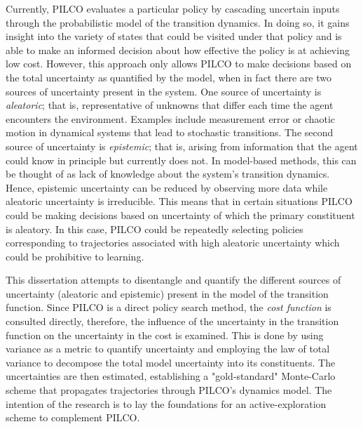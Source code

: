 Currently, PILCO evaluates a particular policy by cascading uncertain inputs through the probabilistic model of the transition dynamics. In doing so, it gains insight into the variety of states that could be visited under that policy and is able to make an informed decision about how effective the policy is at achieving low cost. However, this approach only allows PILCO to make decisions based on the total uncertainty as quantified by the model, when in fact there are two sources of uncertainty present in the system. One source of uncertainty is \textit{aleatoric}; that is, representative of unknowns that differ each time the agent encounters the environment. Examples include measurement error or chaotic motion in dynamical systems that lead to stochastic transitions. The second source of uncertainty is \textit{epistemic}; that is, arising from information that the agent could know in principle but currently does not. In model-based methods, this can be thought of as lack of knowledge about the system's transition dynamics. Hence, epistemic uncertainty can be reduced by observing more data while aleatoric uncertainty is irreducible. This means that in certain situations PILCO could be making decisions based on uncertainty of which the primary constituent is aleatory. In this case, PILCO could be repeatedly selecting policies corresponding to trajectories associated with high aleatoric uncertainty which could be prohibitive to learning.

This dissertation attempts to disentangle and quantify the different sources of uncertainty (aleatoric and epistemic) present in the model of the transition function. Since PILCO is a direct policy search method, the \textit{cost function} is consulted directly, therefore, the influence of the uncertainty in the transition function on the uncertainty in the cost is examined. This is done by using variance as a metric to quantify uncertainty and employing the law of total variance to decompose the total model uncertainty into its constituents. The uncertainties are then estimated, establishing a "gold-standard" Monte-Carlo scheme that propagates trajectories through PILCO's dynamics model. The intention of the research is to lay the foundations for an active-exploration scheme to complement PILCO. 


